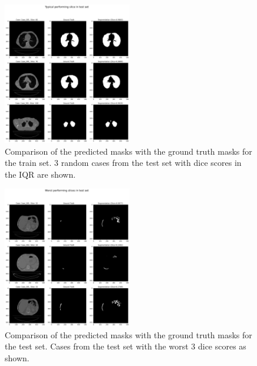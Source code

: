 \documentclass[11pt]{article}
\begin{document}
\begin{figure}[H]
    \centering
    \includegraphics[width=0.5\textwidth]{figs/Typical performing slice in test set.png}
    \caption{Comparison of the predicted masks with the ground truth masks for the train set. 3 random cases from the test set with dice scores in the IQR are shown.}
    \label{fig:typical_test_mask_comparison}
\end{figure}

\begin{figure}[H]
    \centering
    \includegraphics[width=0.5\textwidth]{figs/Worst performing slices in test set.png}
    \caption{Comparison of the predicted masks with the ground truth masks for the test set. Cases from the test set with the worst 3 dice scores as shown.}
    \label{fig:worst_test_mask_comparison}
\end{figure}
\end{document}
